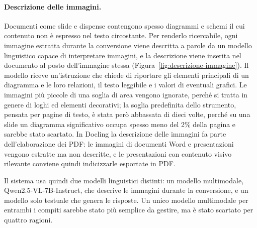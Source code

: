 \paragraph{Descrizione delle immagini.} Documenti come slide e dispense contengono spesso diagrammi e schemi il
cui contenuto non è espresso nel testo circostante. Per renderlo ricercabile, ogni immagine estratta durante la
conversione viene descritta a parole da un modello linguistico capace di interpretare immagini, e la descrizione
viene inserita nel documento al posto dell'immagine stessa (Figura~\ref{fig:descrizione-immagine}). Il modello
riceve un'istruzione che chiede di riportare gli elementi principali di un diagramma e le loro relazioni, il testo
leggibile e i valori di eventuali grafici. Le immagini più piccole di una soglia di area vengono ignorate, perché si tratta in
genere di loghi ed elementi decorativi; la soglia predefinita dello strumento, pensata per pagine di testo, è stata
però abbassata di dieci volte, perché su una slide un diagramma significativo occupa spesso meno del 2\% della
pagina e sarebbe stato scartato. In Docling la descrizione delle immagini fa parte dell'elaborazione dei PDF: le
immagini di documenti Word e presentazioni vengono estratte ma non descritte, e le presentazioni con contenuto
visivo rilevante conviene quindi indicizzarle esportate in PDF.


Il sistema usa quindi due modelli linguistici distinti: un modello multimodale, Qwen2.5-VL-7B-Instruct, che descrive
le immagini durante la conversione, e un modello solo testuale che genera le risposte. Un unico
modello multimodale per entrambi i compiti sarebbe stato più semplice da gestire, ma è stato scartato per quattro
ragioni.


